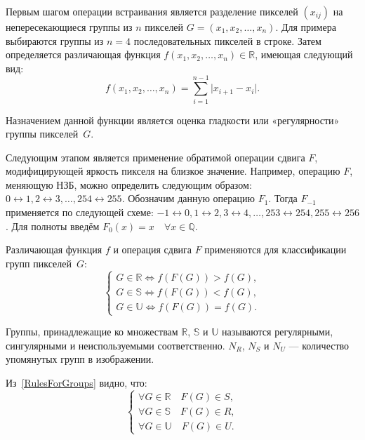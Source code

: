 Первым шагом операции встраивания является разделение пикселей $ (x_{ij}) $ на непересекающиеся группы из $ n $ пикселей $ G = (x_1, x_2, \ldots, x_n) $. Для примера выбираются группы из $ n = 4 $ последовательных пикселей в строке. Затем определяется различающая функция $ f(x_1, x_2, \ldots, x_n) \in \mathbb{R} $, имеющая следующий вид:
\begin{equation*}
f(x_1, x_2, \ldots, x_n) = \sum_{i = 1}^{n - 1} \lvert x_{i + 1} - x_i \rvert.
\end{equation*}

Назначением данной функции является оценка гладкости или «регулярности» группы пикселей~$ G $.

Следующим этапом является применение обратимой операции сдвига $ F $, модифицирующей яркость пикселя на близкое значение. Например, операцию $ F $, меняющую НЗБ, можно определить следующим образом: $ 0 \leftrightarrow 1, 2 \leftrightarrow 3, \ldots, 254 \leftrightarrow 255 $. Обозначим данную операцию $ F_1 $. Тогда $ F_{-1} $ применяется по следующей схеме: $ -1 \leftrightarrow 0, 1 \leftrightarrow 2, 3 \leftrightarrow 4, \ldots, 253 \leftrightarrow 254, 255 \leftrightarrow 256 $. Для полноты введём $ F_0(x) = x \quad \forall x \in \mathbb{Q} $.

Различающая функция $ f $ и операция сдвига $ F $ применяются для классификации групп пикселей~$ G $:
\begin{equation}
\begin{cases}
G \in \mathbb{R} \Longleftrightarrow f(F(G)) > f(G), \\
G \in \mathbb{S} \Longleftrightarrow f(F(G)) < f(G), \\
G \in \mathbb{U} \Longleftrightarrow f(F(G)) = f(G).
\end{cases}
\label{RulesForGroups}
\end{equation}

Группы, принадлежащие ко множествам $ \mathbb{R} $, $ \mathbb{S} $ и $ \mathbb{U} $ называются регулярными, сингулярными и неиспользуемыми соответственно. $ N_R $, $ N_S $ и $ N_U $ --- количество упомянутых групп в изображении.

Из~\ref{RulesForGroups} видно, что:
\begin{equation*}
\begin{cases}
\forall G \in \mathbb{R} \quad F(G) \in S, \\
\forall G \in \mathbb{S} \quad F(G) \in R, \\
\forall G \in \mathbb{U} \quad F(G) \in U.
\end{cases}
\end{equation*}

